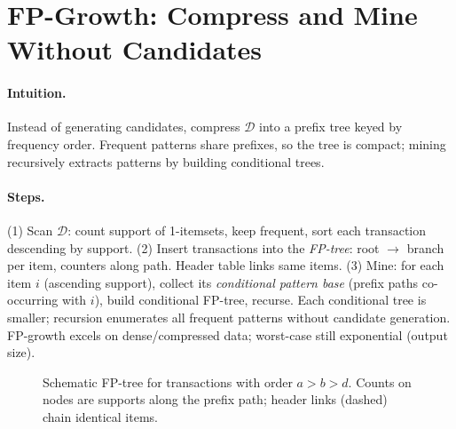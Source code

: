 \section{FP-Growth: Compress and Mine Without Candidates}
\label{sec:fpgrowth}
\paragraph{Intuition.} Instead of generating candidates, compress $\mathcal{D}$ into a prefix tree keyed by frequency order. Frequent patterns share prefixes, so the tree is compact; mining recursively extracts patterns by building conditional trees.

\paragraph{Steps.} (1) Scan $\mathcal{D}$: count support of 1-itemsets, keep frequent, sort each transaction descending by support. (2) Insert transactions into the \emph{FP-tree}: root $\to$ branch per item, counters along path. Header table links same items. (3) Mine: for each item $i$ (ascending support), collect its \emph{conditional pattern base} (prefix paths co-occurring with $i$), build conditional FP-tree, recurse. Each conditional tree is smaller; recursion enumerates all frequent patterns without candidate generation. FP-growth excels on dense/compressed data; worst-case still exponential (output size).

\begin{figure}[h]\centering
{}
\caption{Schematic FP-tree for transactions with order $a>b>d$. Counts on nodes are supports along the prefix path; header links (dashed) chain identical items.}
\label{fig:fptree}
\end{figure}

